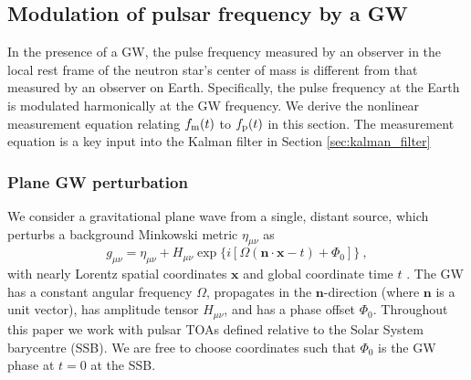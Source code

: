 \documentclass[fleqn,usenatbib,useAMS]{mnras}
\begin{document}
\subsection{Modulation of pulsar frequency by a GW} \label{sec:psr_measured}
In the presence of a GW, the pulse frequency measured by an observer in the local rest frame of the neutron star's center of mass is different from that measured by an observer on Earth. Specifically, the pulse frequency at the Earth is modulated harmonically at the GW frequency. We derive the nonlinear measurement equation relating $f_{\rm m}(t)$ to $f_{\rm p}(t)$ in this section. The measurement equation is a key input into the Kalman filter in Section \ref{sec:kalman_filter}
\subsubsection{Plane GW perturbation}\label{sec:plane_gw}
We consider a gravitational plane wave from a single, distant source, which perturbs a background Minkowski metric $\eta_{\mu \nu}$ as
\begin{equation}
	g_{\mu \nu} = \eta_{\mu \nu} + H_{\mu \nu} \exp{ \{ i[\Omega(\boldsymbol{n} \cdot \boldsymbol{x} - t) + \Phi_0] \} } \ ,
\end{equation}
with nearly Lorentz spatial coordinates $\boldsymbol{x}$ and global coordinate time $t$ \citep{schutz2022}. The GW has a constant angular frequency $\Omega$, propagates in the $\boldsymbol{n}$-direction (where $\boldsymbol{n}$ is a unit vector), has amplitude tensor $H_{\mu \nu}$, and has a phase offset  $\Phi_0$. Throughout this paper we work with pulsar TOAs defined relative to the Solar System barycentre (SSB). We are free to choose coordinates such that $\Phi_0$ is the GW phase at $t=0$ at the SSB. \newline 
\end{document}
